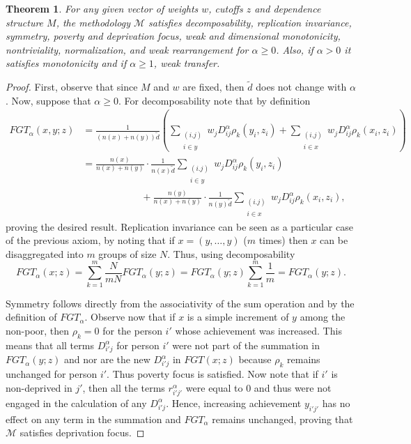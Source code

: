 \documentclass[english, a4paper,12pt]{article}
\newtheorem{theorem}{Theorem}
\begin{document}
\begin{theorem} For any given vector of weights $w$, cutoffs $z$ and dependence structure $M$, the methodology $\mathcal{M}$ satisfies decomposability, replication invariance, symmetry, poverty and deprivation focus, weak and dimensional monotonicity, nontriviality, normalization, and weak rearrangement for $\alpha \geq 0$. Also, if $\alpha > 0$ it satisfies monotonicity and if $\alpha \geq 1$, weak transfer.
\end{theorem}

\begin{proof} First, observe that since $M$ and $w$ are fixed, then $\tilde{d}$ does not change with $\alpha$. Now, suppose that $\alpha \geq 0$. For decomposability note that by definition
	\begin{align*}
		FGT_{\alpha}(x,y; z)
			&=	\frac{1}{(n(x) + n(y))\tilde{d}} \left(\sum_{\substack{(i.j) \\ i \in y}} w_{j}D_{ij}^{\alpha}\rho_{k}(y_{i}, z_{i}) + \sum_{\substack{(i.j) \\ i \in x}} w_{j}D_{ij}^{\alpha}\rho_{k}(x_{i}, z_{i}) \right)	\\
			&=	\frac{n(x)}{n(x) + n(y)} \cdot \frac{1}{n(x)\tilde{d}} \sum_{\substack{(i.j) \\ i \in y}} w_{j}D_{ij}^{\alpha}\rho_{k}(y_{i}, z_{i})	\\
			&\qquad\qquad\qquad
					+ \frac{n(y)}{n(x) + n(y)} \cdot \frac{1}{n(y)\tilde{d}} \sum_{\substack{(i.j) \\ i \in x}} w_{j}D_{ij}^{\alpha}\rho_{k}(x_{i}, z_{i}),
	\end{align*}
proving the desired result. Replication invariance can be seen as a particular case of the previous axiom, by noting that if $x = (y ,\ldots, y)$ ($m$ times) then $x$ can be disaggregated into $m$ groups of size $N$. Thus, using decomposability
	$$FGT_{\alpha}(x;z) = \sum_{k=1}^{m} \frac{N}{mN} FGT_{\alpha}(y; z) = FGT_{\alpha}(y;z) \sum_{k=1}^{m} \frac{1}{m} = FGT_{\alpha}(y;z).$$

Symmetry follows directly from the associativity of the sum operation and by the definition of $FGT_{\alpha}$. Observe now that if $x$ is a simple increment of $y$ among the non-poor, then $\rho_{k} = 0$ for the person $i'$ whose achievement was increased. This means that all terms $D_{i'j}^{\alpha}$ for person $i'$ were not part of the summation in $FGT_{\alpha}(y;z)$ and nor are the new $D_{i'j}^{\alpha}$ in $FGT(x;z)$ because $\rho_{k}$ remains unchanged for person $i'$. Thus poverty focus is satisfied. Now note that if $i'$ is non-deprived in $j'$, then all the terms $r_{i'j'}^{\alpha}$ were equal to 0 and thus were not engaged in the calculation of any $D_{i'j}^{\alpha}$. Hence, increasing achievement $y_{i'j'}$ has no effect on any term in the summation and $FGT_{\alpha}$ remains unchanged, proving that $\mathcal{M}$ satisfies deprivation focus.


\end{proof}
\end{document}
